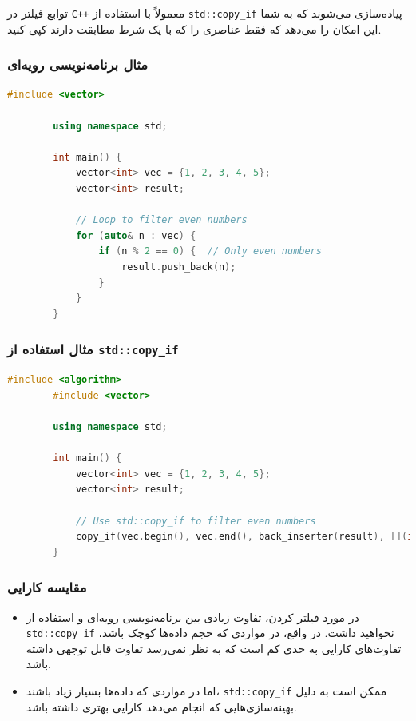 \documentclass[12pt, a4paper]{report}
\begin{document}
توابع فیلتر در \texttt{C++} معمولاً با استفاده از \texttt{std::copy\_if} پیاده‌سازی می‌شوند که به شما این امکان را می‌دهد که فقط عناصری را که با یک شرط مطابقت دارند کپی کنید.

\subsubsection{مثال برنامه‌نویسی رویه‌ای}
\begin{LTR}
	\begin{lstlisting}[language=C++, breaklines=true]
		#include <vector>
		
		using namespace std;
		
		int main() {
			vector<int> vec = {1, 2, 3, 4, 5};
			vector<int> result;
			
			// Loop to filter even numbers
			for (auto& n : vec) {
				if (n % 2 == 0) {  // Only even numbers
					result.push_back(n);
				}
			}
		}
	\end{lstlisting}
\end{LTR}

\subsubsection{مثال استفاده از \texttt{std::copy\_if} }
\begin{LTR}
	\begin{lstlisting}[language=C++, breaklines=true]
		#include <algorithm>
		#include <vector>
		
		using namespace std;
		
		int main() {
			vector<int> vec = {1, 2, 3, 4, 5};
			vector<int> result;
			
			// Use std::copy_if to filter even numbers
			copy_if(vec.begin(), vec.end(), back_inserter(result), [](int n) { return n % 2 == 0; });
		}
	\end{lstlisting}
\end{LTR}

\subsubsection{مقایسه کارایی}
\begin{itemize}
	\item در مورد فیلتر کردن، تفاوت زیادی بین برنامه‌نویسی رویه‌ای و استفاده از \texttt{std::copy\_if} نخواهید داشت. در واقع، در مواردی که حجم داده‌ها کوچک باشد، تفاوت‌های کارایی به حدی کم است که به نظر نمی‌رسد تفاوت قابل توجهی داشته باشد.
	\item اما در مواردی که داده‌ها بسیار زیاد باشند، \texttt{std::copy\_if} ممکن است به دلیل بهینه‌سازی‌هایی که انجام می‌دهد کارایی بهتری داشته باشد.
\end{itemize}
\end{document}
